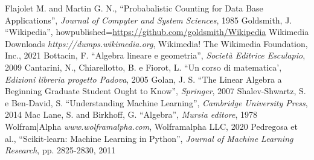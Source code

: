 \documentclass[12pt]{article}
\begin{document}
\pagebreak
\clearpage\null\newpage
\begin{thebibliography}{widest entry}
 Flajolet M. and Martin G. N., ``Probabalistic Counting for Data Base Applications'', \emph{Journal of Compyter and System Sciences}, 1985
 Goldsmith, J. ``Wikipedia'', howpublished={\url{https://github.com/goldsmith/Wikipedia}}
 Wikimedia Downloads \emph{https://dumps.wikimedia.org}, Wikimedia! The Wikimedia Foundation, Inc., 2021
 Bottacin, F. ``Algebra lineare e geometria'', \emph{Societ\`a Editrice Esculapio}, 2009
  Cantarini, N., Chiarellotto, B. e Fiorot, L. ``Un corso di matematica', \emph{Edizioni libreria progetto Padova}, 2005
  Golan, J. S. ``The Linear Algebra a Beginning Graduate Student Ought to Know'', \emph{Springer}, 2007
  Shalev-Shwartz, S. e Ben-David, S. ``Understanding Machine Learning'', \emph{Cambridge University Press}, 2014
  Mac Lane, S. and Birkhoff, G. ``Algebra'', \emph{Mursia editore}, 1978 
  Wolfram|Alpha \emph{www.wolframalpha.com}, Wolframalpha LLC, 2020
  Pedregosa et al., ``Scikit-learn: Machine Learning in Python'', \emph{Journal of Machine Learning Research}, pp. 2825-2830, 2011
\end{thebibliography}
\end{document}
